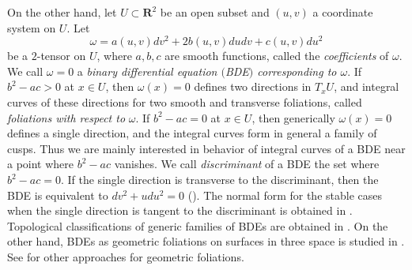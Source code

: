 \documentclass[a4paper, 12pt]{article}
\theoremstyle{definition}
\numberwithin{equation}{section}
\begin{document}
On the other hand,
let $U\subset {\boldsymbol{R}}^2$ be an open subset and $(u,v)$ a
coordinate system on $U$.
Let 
\begin{equation}\label{eq:BDE}
\omega
=
a(u,v) dv^2 + 2b(u,v) dudv + c(u,v) du^2
\end{equation}
be a $2$-tensor on $U$,
where $a,b,c$ are smooth functions, called the {\em coefficients\/}
of $\omega$. 
We call $\omega=0$ 
a {\em binary differential equation\/ $($BDE\/$)$ 
corresponding to\/ $\omega$}.
If $b^2-ac>0$ at $x\in U$, then
$\omega(x)=0$ defines two directions 
in $T_xU$,
and
integral curves of these directions
for two smooth and transverse foliations,
called {\it foliations with respect to\/} $\omega$.
If $b^2-ac=0$ at $x\in U$, then
generically $\omega(x)=0$ defines a single direction,
and the integral curves form in general a family of cusps.
Thus we are mainly interested in behavior of 
integral curves of a BDE near a point
where $b^2-ac$ vanishes.
We call {\it discriminant} of a BDE the set where $b^2-ac=0$.
If the single direction is transverse to 
the discriminant, then 
the BDE is equivalent to $dv^2 +udu^2 = 0$ (\cite{c,dara}).
The normal form for the stable cases
when the single direction is tangent to the discriminant
is obtained in \cite{d1,d2}.
Topological classifications of generic families
of BDEs are obtained in 
\cite{BFT,BTbinary,BTimplicit,joey,faridtari,t}.
On the other hand,
BDEs as geometric foliations on surfaces in three space is
studied in \cite{BF,ggs,guinez1,guinez2,gg,faridtari}.
See \cite{diis,hiiy,if} for other approaches for
geometric foliations.
\end{document}
